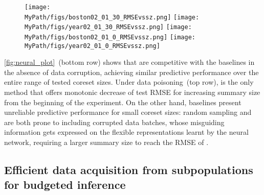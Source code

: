 \begin{figure*}[!t]
	\begin{subfigure}[b]{0.9\textwidth} 
		\centering
		\texttt{[image: \\MyPath/figs/boston02\_01\_30\_RMSEvssz.png]}
		\hfill
		\texttt{[image: \\MyPath/figs/year02\_01\_30\_RMSEvssz.png]}
		\centering
		\hfill
		\texttt{[image: \\MyPath/figs/boston02\_01\_0\_RMSEvssz.png]}
		\centering
		\hfill
		\texttt{[image: \\MyPath/figs/year02\_01\_0\_RMSEvssz.png]}
	\end{subfigure}	
	\centering
	\caption{Test RMSE vs coreset size for neural linear regression experiments averaged over 30 trials. Solid lines display the median RMSE, with shaded areas showing $25\textsuperscript{th}$ and $75\textsuperscript{th}$ percentiles. Dataset corruption rate $F$, and $\beta$ value used in \bcores{} for each experiment are shown on the figures. The bottom row plots illustrate the achieved predictive performance under no contamination.}
	\label{fig:neural_plot}
\end{figure*}


\cref{fig:neural_plot}~(bottom row) shows that \bcores{} are competitive with the baselines in the absence of data corruption, achieving similar predictive performance over the entire range of tested coreset sizes. Under data poisoning~(top row), \bcores{} is the only method that offers monotonic decrease of test RMSE for increasing summary size from the beginning of the experiment. On the other hand, baselines present unreliable predictive performance for small coreset sizes: random sampling and \sparsevi{} are both prone to including corrupted data batches, whose misguiding information gets expressed on the flexible representations learnt by the neural network, requiring a larger summary size to reach the RMSE of \bcores.




\subsection{Efficient data acquisition from subpopulations for budgeted inference}
\label{sec:active-selection}


